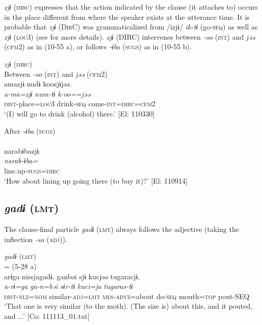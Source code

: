 \textit{zjɨ} (\textsc{dirc}) expresses that the action indicated by the clause (it attaches to) occurs in the place different from where the speaker exists at the utterance time. It is probable that \textit{zjɨ} (D\textsc{ir}C) was grammaticalized from /izjɨ/ \textit{ik-tɨ} (go-\textsc{seq}) as well as \textit{zjɨ} (\textsc{loc}3) (see  for more details). \textit{zjɨ} (DIRC) intervenes between \textit{{}-oo} (\textsc{int}) and \textit{jəə} (\textsc{cfm}2) as in (10-55 a), or follows \textit{{}-ɨba} (\textsc{sugs}) as in (10-55 b).

\ea\label{ex:10.55}   \textit{zjɨ} (\textsc{dirc})\\
  \ea Between \textit{{}-oo} (\textsc{int}) and \textit{jəə} (\textsc{cfm}2)\\
      \glll    amazjɨ  nudɨ  koozjɨjəə.\\
    \textit{a-ma=zjɨ}  \textit{num-tɨ}  \textit{k-oo==jəə}\\
    \textsc{dist}-place=\textsc{loc}3  drink-\textsc{seq}  come-\textsc{int}=\textsc{dirc}=\textsc{cfm}2\\
    \glt     ‘(I) will go to drink (alcohol) there.’ [El: 110330]

  \ex After \textit{{}-ɨba} (\textsc{sugs})\\\\
      \glll    narabɨbazjɨ.\\
    \textit{narab-ɨba=}\\
    line.up-\textsc{sugs}=\textsc{dirc}\\
    \glt     ‘How about lining up going there (to buy it)?’ [El: 110914]
    \z
\z

\subsection{\textit{gadɨ} (\textsc{lmt})}\label{sec:10.3.10}

The clause-final particle \textit{gadɨ} (\textsc{lmt}) always follows the adjective (taking the inflection \textit{{}-sa} (\textsc{adj})).

\ea\label{ex:10.56}   \textit{gadɨ} (\textsc{lmt})\\ = (5-28 a)\\
      \glll    arɨga  nissjagadɨ.  ganbəi  sjɨ   kucjəə  tugaracjɨ,\\
    \textit{a-rɨ=ga}  \textit{}  \textit{ga-n=bəi}  \textit{sɨr-tɨ}   \textit{kuci=ja}  \textit{tugaras-tɨ}\\
    \textsc{dist}-\textsc{nlz}=\textsc{nom}  similar-\textsc{adj}=\textsc{lmt}  \textsc{mes}-\textsc{advz}=about  do-\textsc{seq}   mouth=\textsc{top}  pout-SEQ\\
\glt     ‘That one is very similar (to the moth). (The size is) about this, and it pouted, and ...’  [Co: 111113\_01.txt]
\z

